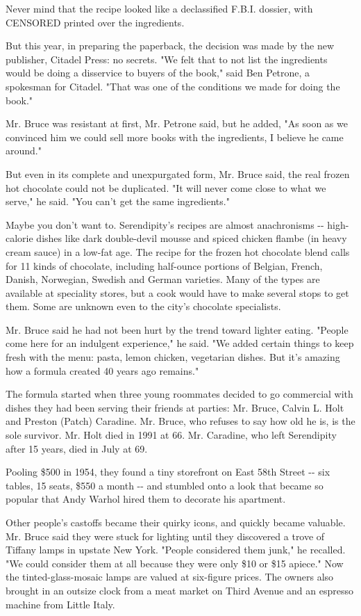 Never mind that the recipe looked like a declassified F.B.I. dossier,
with CENSORED printed over the ingredients.

But this year, in preparing the paperback, the decision was made by the
new publisher, Citadel Press: no secrets. "We felt that to not list the
ingredients would be doing a disservice to buyers of the book," said Ben
Petrone, a spokesman for Citadel. "That was one of the conditions we
made for doing the book."

Mr. Bruce was resistant at first, Mr. Petrone said, but he added, "As
soon as we convinced him we could sell more books with the ingredients,
I believe he came around."

But even in its complete and unexpurgated form, Mr. Bruce said, the real
frozen hot chocolate could not be duplicated. "It will never come close
to what we serve," he said. "You can't get the same ingredients."

Maybe you don't want to. Serendipity's recipes are almost anachronisms
-\/- high-calorie dishes like dark double-devil mousse and spiced
chicken flambe (in heavy cream sauce) in a low-fat age. The recipe for
the frozen hot chocolate blend calls for 11 kinds of chocolate,
including half-ounce portions of Belgian, French, Danish, Norwegian,
Swedish and German varieties. Many of the types are available at
speciality stores, but a cook would have to make several stops to get
them. Some are unknown even to the city's chocolate specialists.

Mr. Bruce said he had not been hurt by the trend toward lighter eating.
"People come here for an indulgent experience," he said. "We added
certain things to keep fresh with the menu: pasta, lemon chicken,
vegetarian dishes. But it's amazing how a formula created 40 years ago
remains."

The formula started when three young roommates decided to go commercial
with dishes they had been serving their friends at parties: Mr. Bruce,
Calvin L. Holt and Preston (Patch) Caradine. Mr. Bruce, who refuses to
say how old he is, is the sole survivor. Mr. Holt died in 1991 at 66.
Mr. Caradine, who left Serendipity after 15 years, died in July at 69.

Pooling \$500 in 1954, they found a tiny storefront on East 58th Street
-\/- six tables, 15 seats, \$550 a month -\/- and stumbled onto a look
that became so popular that Andy Warhol hired them to decorate his
apartment.

Other people's castoffs became their quirky icons, and quickly became
valuable. Mr. Bruce said they were stuck for lighting until they
discovered a trove of Tiffany lamps in upstate New York. "People
considered them junk," he recalled. "We could consider them at all
because they were only \$10 or \$15 apiece." Now the tinted-glass-mosaic
lamps are valued at six-figure prices. The owners also brought in an
outsize clock from a meat market on Third Avenue and an espresso machine
from Little Italy.


